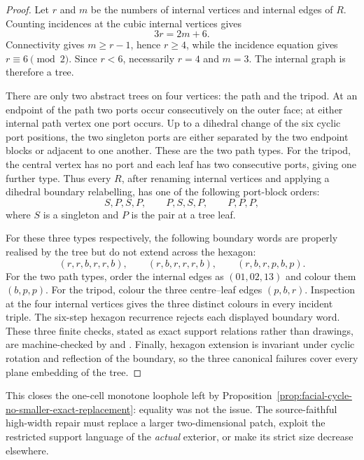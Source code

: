 \begin{proof}
Let \(r\) and \(m\) be the numbers of internal vertices and internal edges of
\(R\).  Counting incidences at the cubic internal vertices gives
\[
                             3r=2m+6.
\]
Connectivity gives \(m\ge r-1\), hence \(r\ge4\), while the incidence
equation gives \(r\equiv6\pmod2\).  Since \(r<6\), necessarily \(r=4\) and
\(m=3\).  The internal graph is therefore a tree.

There are only two abstract trees on four vertices: the path and the tripod.
At an endpoint of the path two ports occur consecutively on the outer face;
at either internal path vertex one port occurs.  Up to a dihedral change of
the six cyclic port positions, the two singleton ports are either separated
by the two endpoint blocks or adjacent to one another.  These are the two
path types.  For the tripod, the central vertex has no port and each leaf has
two consecutive ports, giving one further type.  Thus every \(R\), after
renaming internal vertices and applying a dihedral boundary relabelling, has
one of the following port-block orders:
\[
    S,P,S,P,\qquad P,S,S,P,\qquad P,P,P,
\]
where \(S\) is a singleton and \(P\) is the pair at a tree leaf.

For these three types respectively, the following boundary words are
properly realised by the tree but do not extend across the hexagon:
\[
 (r,r,b,r,r,b),\qquad
 (r,b,r,r,r,b),\qquad
 (r,b,r,p,b,p).
\]
For the two path types, order the internal edges as \((01,02,13)\) and colour
them \((b,p,p)\).  For the tripod, colour the three centre--leaf edges
\((p,b,r)\).  Inspection at the four internal vertices gives the three
distinct colours in every incident triple.  The six-step hexagon recurrence
rejects each displayed boundary word.  These three finite checks, stated as
exact support relations rather than drawings, are machine-checked by
and
.
Finally, hexagon extension is invariant under cyclic rotation and reflection
of the boundary, so the three canonical failures cover every plane embedding
of the tree.
\end{proof}

This closes the one-cell monotone loophole left by
Proposition~\ref{prop:facial-cycle-no-smaller-exact-replacement}: equality was
not the issue.  The source-faithful high-width repair must replace a larger
two-dimensional patch, exploit the restricted support language of the
\emph{actual} exterior, or make its strict size decrease elsewhere.


